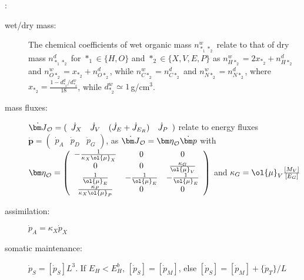 \vspace{5mm}: {\small
\begin{description}
  \item [wet/dry mass: ]
	  The chemical coefficients of wet organic mass $n_{*_1 *_2}^w$ relate to that of dry mass $n_{*_1 *_2}^d$ 
		  for $*_1 \in \{H, O\}$ and $*_2 \in \{X, V, E, P\}$ as 
			$n_{H *_2}^w = 2 x_{*_2} + n_{H *_2}^d$ and $n_{O *_2}^w = x_{*_2} + n_{O *_2}^d$, 
			while $n_{C *_2}^w = n_{C *_2}^d$ and $n_{N *_2}^w = n_{N *_2}^d$, 
			where $x_{*_2} = \frac{1 - d_{*_2}^d/ d_{*_2}^w} {18}$, 
		  while $d_{*_2}^w \simeq 1$\,g/cm$^3$.\\

  \item[mass fluxes: ] $\dot{\bm J}_{\cal O} = (
		\begin{array}{cccc} 
	     \dot{J}_X & \dot{J}_V & (\dot{J}_E + \dot{J}_{E_R}) &  \dot{J}_P 
	  \end{array})$
    relate to energy fluxes 
		$\dot{\bm p} = \left(\begin{array}{ccc} \dot{p}_A & \dot{p}_D & \dot{p}_G \end{array} \right)$, as
    $\dot{\bm J}_{\cal O} = {\bm \eta}_{\cal O} \dot{\bm p}$ with 
    ${\bm \eta}_{\cal O} = 
		  \left( \begin{array}{ccc} 
        -\frac{1} {\kappa_X \ol{\mu}_X}       & 0                       & 0\\ 
			  0                                     & 0                       & \frac{\kappa_G} {\ol{\mu}_V}\\ 
        \frac{1} {\ol{\mu}_E}                 & - \frac{1} {\ol{\mu}_E} & - \frac{1} {\ol{\mu}_E}\\ 
        \frac{\kappa_P} {\kappa_X \ol{\mu}_P} & 0                       & 0 
      \end{array} \right)$
	  and $\kappa_G = \ol{\mu}_V \frac{[M_V]} {[E_G]}$
	
  \item[assimilation: ] $\dot{p}_A = \kappa_X \dot{p}_X$ 

	\item[somatic maintenance: ] $\dot{p}_S = [\dot{p}_S] L^3$.		
	  If $E_H < E_H^b$, $[\dot{p}_S] = [\dot{p}_M]$, else $[\dot{p}_S] = [\dot{p}_M]  + \{\dot{p}_T\}/ L$
			

\end{description}}
